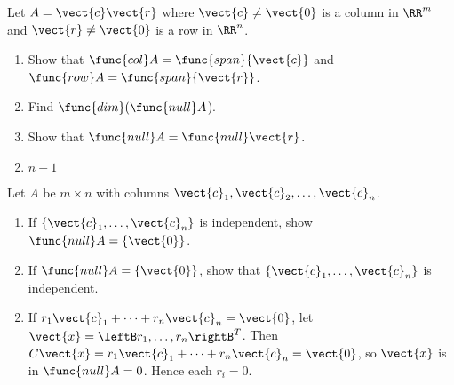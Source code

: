 \begin{multicols}{2}
\begin{ex}
Let $A = \vect{c}\vect{r}$ where $\vect{c} \neq \vect{0}$ is a column in $\RR^m$ and $\vect{r} \neq \vect{0}$ is a row in $\RR^n$.

\begin{enumerate}[label={\alph*.}]
\item Show that $\func{col} A = \func{span}\{\vect{c}\}$ and \newline $\func{row} A = \func{span}\{\vect{r}\}$.

\item Find $\func{dim}(\func{null} A$).

\item Show that $\func{null} A = \func{null} \vect{r}$.

\end{enumerate}
\begin{sol}
\begin{enumerate}[label={\alph*.}]
\setcounter{enumi}{1}
\item  $n - 1$

\end{enumerate}
\end{sol}
\end{ex}

\begin{ex}
Let $A$ be $m \times n$ with columns $\vect{c}_{1}, \vect{c}_{2}, \dots, \vect{c}_{n}$.

\begin{enumerate}[label={\alph*.}]
\item If $\{\vect{c}_{1}, \dots, \vect{c}_{n}\}$ is independent, show $\func{null} A = \{\vect{0}\}$.

\item If $\func{null} A = \{\vect{0}\}$, show that $\{\vect{c}_{1}, \dots, \vect{c}_{n}\}$ is independent.

\end{enumerate}
\begin{sol}
\begin{enumerate}[label={\alph*.}]
\setcounter{enumi}{1}
\item  If $r_{1}\vect{c}_{1} + \dots + r_{n}\vect{c}_{n} = \vect{0}$, let $\vect{x} = \leftB r_{1}, \dots, r_{n} \rightB^{T}$. Then $C\vect{x} = r_{1}\vect{c}_{1} + \dots + r_{n}\vect{c}_{n} = \vect{0}$, so $\vect{x}$ is in $\func{null} A = 0$. Hence each $r_{i} = 0$.

\end{enumerate}
\end{sol}
\end{ex}


\end{multicols}

